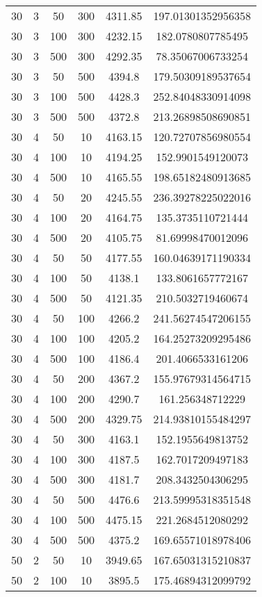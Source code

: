 {\begin{longtabu}{S
S
S
S
S[round-mode=places, round-precision=0]
S[round-mode=places, round-precision=0]}
30 & 3 & 50 & 300 & 4311.85 & 197.01301352956358 \\
30 & 3 & 100 & 300 & 4232.15 & 182.0780807785495 \\
30 & 3 & 500 & 300 & 4292.35 & 78.35067006733254 \\
30 & 3 & 50 & 500 & 4394.8 & 179.50309189537654 \\
30 & 3 & 100 & 500 & 4428.3 & 252.84048330914098 \\
30 & 3 & 500 & 500 & 4372.8 & 213.26898508690851 \\
30 & 4 & 50 & 10 & 4163.15 & 120.72707856980554 \\
30 & 4 & 100 & 10 & 4194.25 & 152.9901549120073 \\
30 & 4 & 500 & 10 & 4165.55 & 198.65182480913685 \\
30 & 4 & 50 & 20 & 4245.55 & 236.39278225022016 \\
30 & 4 & 100 & 20 & 4164.75 & 135.3735110721444 \\
30 & 4 & 500 & 20 & 4105.75 & 81.69998470012096 \\
30 & 4 & 50 & 50 & 4177.55 & 160.04639171190334 \\
30 & 4 & 100 & 50 & 4138.1 & 133.8061657772167 \\
30 & 4 & 500 & 50 & 4121.35 & 210.5032719460674 \\
30 & 4 & 50 & 100 & 4266.2 & 241.56274547206155 \\
30 & 4 & 100 & 100 & 4205.2 & 164.25273209295486 \\
30 & 4 & 500 & 100 & 4186.4 & 201.4066533161206 \\
30 & 4 & 50 & 200 & 4367.2 & 155.97679314564715 \\
30 & 4 & 100 & 200 & 4290.7 & 161.256348712229 \\
30 & 4 & 500 & 200 & 4329.75 & 214.93810155484297 \\
30 & 4 & 50 & 300 & 4163.1 & 152.1955649813752 \\
30 & 4 & 100 & 300 & 4187.5 & 162.7017209497183 \\
30 & 4 & 500 & 300 & 4181.7 & 208.3432504306295 \\
30 & 4 & 50 & 500 & 4476.6 & 213.59995318351548 \\
30 & 4 & 100 & 500 & 4475.15 & 221.2684512080292 \\
30 & 4 & 500 & 500 & 4375.2 & 169.65571018978406 \\
50 & 2 & 50 & 10 & 3949.65 & 167.65031315210837 \\
50 & 2 & 100 & 10 & 3895.5 & 175.46894312099792 \\

\end{longtabu}}
